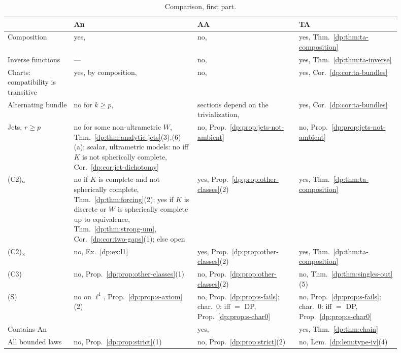 \begin{table}[htbp]
\small
\caption{Comparison, first part.}\label{dp:tab:compare}
\begin{tabular}{@{}p{0.15\linewidth}p{0.29\linewidth}p{0.23\linewidth}p{0.23\linewidth}@{}}
 & An & AA & TA\\
\hline
Composition & yes, \cite[Proposition~14.26, proof, Step~1]{I} & no, \cite[Theorem~14.17]{I} & yes, Thm.~\ref{dp:thm:ta-composition}\\
Inverse functions & --- & no, \cite[Corollary~14.19(1)]{I} & yes, Thm.~\ref{dp:thm:ta-inverse}\\
Charts: compatibility is transitive & yes, by composition, \cite[Proposition~14.26, proof, Step~1]{I} & no, \cite[Corollary~14.19(3)]{I} & yes, Cor.~\ref{dp:cor:ta-bundles}\\
Alternating bundle & no for $k\ge p$, \cite[Theorem~7.2, Corollary~10.2]{I} & sections depend on the trivialization, \cite[Corollary~14.19(4)]{I} & yes, Cor.~\ref{dp:cor:ta-bundles}\\
Jets, $r\ge p$ & no for some non-ultrametric $W$, Thm.~\ref{dp:thm:analytic-jets}(3),(6)(a); scalar, ultrametric models: no iff $K$ is not spherically complete, Cor.~\ref{dp:cor:jet-dichotomy} & no, Prop.~\ref{dp:prop:jets-not-ambient} & no, Prop.~\ref{dp:prop:jets-not-ambient}\\
(C2)$_{\rm u}$ & no if $K$ is complete and not spherically complete, Thm.~\ref{dp:thm:forcing}(2); yes if $K$ is discrete or $W$ is spherically complete up to equivalence, Thm.~\ref{dp:thm:strong-um}, Cor.~\ref{dp:cor:two-gaps}(1); else open & yes, Prop.~\ref{dp:prop:other-classes}(2) & yes, Thm.~\ref{dp:thm:ta-composition}\\
(C2)$_\times$ & no, Ex.~\ref{dp:ex:l1} & yes, Prop.~\ref{dp:prop:other-classes}(2) & yes, Thm.~\ref{dp:thm:ta-composition}\\
(C3) & no, Prop.~\ref{dp:prop:other-classes}(1) & no, Prop.~\ref{dp:prop:other-classes}(2) & no, Thm.~\ref{dp:thm:singles-out}(5)\\
(S) & no on $\ell^1$, Prop.~\ref{dp:prop:s-axiom}(2) & no, Prop.~\ref{dp:prop:s-fails}; char.\ $0$: iff $=$ DP, Prop.~\ref{dp:prop:s-char0} & no, Prop.~\ref{dp:prop:s-fails}; char.\ $0$: iff $=$ DP, Prop.~\ref{dp:prop:s-char0}\\
Contains An & & yes, \cite[Definition~14.7]{I} & yes, Thm.~\ref{dp:thm:chain}\\
All bounded laws & no, Prop.~\ref{dp:prop:strict}(1) & no, Prop.~\ref{dp:prop:strict}(2) & no, Lem.~\ref{dp:lem:type-iv}(4)\\

\end{tabular}
\end{table}
